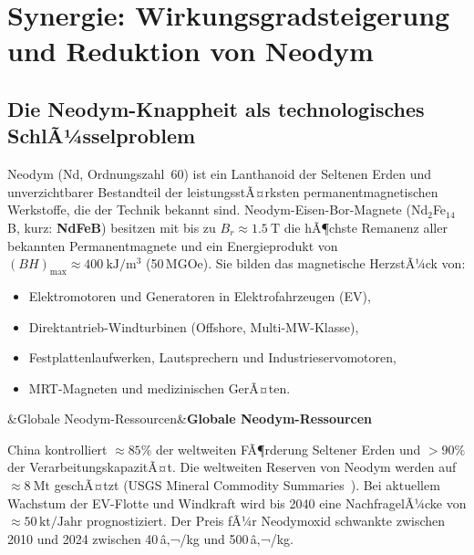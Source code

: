 ﻿\documentclass[12pt, a4paper]{report}
\newenvironment{hinweis}[1][]{%
  \begin{hinweisframe}\sloppy%
  \ifx&#1&\else\textbf{#1}\par\smallskip\fi}{\end{hinweisframe}}
\theoremstyle{definition}
\theoremstyle{remark}
\begin{document}
\chapter{Synergie: Wirkungsgradsteigerung und Reduktion von Neodym}
\label{sec:synergie}

\section{Die Neodym-Knappheit als technologisches SchlÃ¼sselproblem}
\label{ssec:neodym_motivation}

Neodym (\textrm{Nd}, Ordnungszahl~60) ist ein Lanthanoid der Seltenen Erden und
unverzichtbarer Bestandteil der leistungsstÃ¤rksten permanentmagnetischen
Werkstoffe, die der Technik bekannt sind. Neodym-Eisen-Bor-Magnete
(Nd$_2$Fe$_{14}$B, kurz: \textbf{NdFeB}) besitzen mit bis zu
$B_r \approx \SI{1.5}{\tesla}$ die hÃ¶chste Remanenz aller bekannten
Permanentmagnete und ein Energieprodukt von
$(BH)_{\max} \approx \SI{400}{\kilo\joule\per\cubic\metre}$
(50\,MGOe). Sie bilden das magnetische HerzstÃ¼ck
von:
\begin{itemize}
  \item Elektromotoren und Generatoren in Elektrofahrzeugen (EV),
  \item Direktantrieb-Windturbinen (Offshore, Multi-MW-Klasse),
  \item Festplattenlaufwerken, Lautsprechern und Industrieservomotoren,
  \item MRT-Magneten und medizinischen GerÃ¤ten.
\end{itemize}

\begin{hinweis}[Globale Neodym-Ressourcen]
  China kontrolliert $\approx 85\%$ der weltweiten FÃ¶rderung Seltener Erden
  und $>90\%$ der VerarbeitungskapazitÃ¤t. Die weltweiten Reserven von
  Neodym werden auf $\approx \SI{8}{\mega\tonne}$ geschÃ¤tzt
  (USGS Mineral Commodity Summaries~\cite{usgs2024}). Bei aktuellem Wachstum der
  EV-Flotte und Windkraft wird bis 2040 eine NachfragelÃ¼cke von
  $\approx 50\,\text{kt/Jahr}$ prognostiziert. Der
  Preis fÃ¼r Neodymoxid schwankte zwischen 2010 und 2024 zwischen
  40\,â‚¬/kg und 500\,â‚¬/kg.
\end{hinweis}
\end{document}
